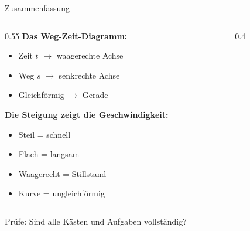 \documentclass[aspectratio=169,11pt]{beamer}
\begin{document}
\begin{frame}{Zusammenfassung}
    \begin{columns}
        \begin{column}{0.55\textwidth}
            \textbf{Das Weg-Zeit-Diagramm:}
            \begin{itemize}
                \item Zeit $t$ $\rightarrow$ waagerechte Achse
                \item Weg $s$ $\rightarrow$ senkrechte Achse
                \item Gleichförmig $\rightarrow$ Gerade
            \end{itemize}

            \vspace{0.5em}
            \textbf{Die Steigung zeigt die Geschwindigkeit:}
            \begin{itemize}
                \item Steil = schnell
                \item Flach = langsam
                \item Waagerecht = Stillstand
                \item Kurve = ungleichförmig
            \end{itemize}
        \end{column}
        \begin{column}{0.4\textwidth}
        \end{column}
    \end{columns}

    \vspace{0.5em}
    \begin{abhinweis}
        Prüfe: Sind alle Kästen und Aufgaben vollständig?
    \end{abhinweis}
\end{frame}
\end{document}
